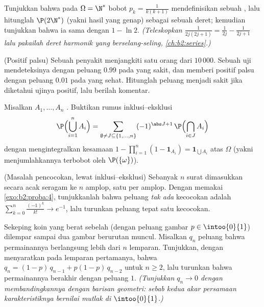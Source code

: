 \begin{exercise}[$\star$]\label{exo:b2:proba:2}
Tunjukkan bahwa pada $\Omega = \N^*$ bobot $p_k = \frac{1}{k(k+1)}$
mendefinisikan sebuah , lalu hitunglah $\P(2\N^*)$ (yakni hasil
yang genap) sebagai sebuah deret; kemudian tunjukkan bahwa ia sama dengan $1 - \ln 2$.
\emph{(Teleskopkan $\frac{1}{2j(2j+1)} = \frac{1}{2j} -
\frac{1}{2j+1}$ lalu pakailah deret harmonik yang berselang-seling,
\cref{ch:b2:series}.)}
\end{exercise}

\begin{exercise}[$\star$]\label{exo:b2:proba:3}
(Positif palsu) Sebuah penyakit menjangkiti satu orang dari $10\,000$. Sebuah
uji mendeteksinya dengan peluang $0.99$ pada yang sakit, dan memberi
positif palsu dengan peluang $0.01$ pada yang sehat. Hitunglah
peluang menjadi sakit jika diketahui ujinya positif, lalu berilah komentar.
\end{exercise}

\begin{exercise}[$\star\star$]\label{exo:b2:proba:4}
Misalkan $A_1, \dots, A_n$ . Buktikan rumus
inklusi--eksklusi
\[
\P\Bigl(\bigcup_{i=1}^n A_i\Bigr)
= \sum_{\emptyset \neq J \subseteq \{1,\dots,n\}}
(-1)^{\abs J + 1}\,\P\Bigl(\bigcap_{i \in J}A_i\Bigr)
\]
dengan mengintegralkan kesamaan $1 - \prod_{i=1}^n(1 -
\mathbf{1}_{A_i}) = \mathbf{1}_{\bigcup A_i}$ atas $\Omega$
(yakni menjumlahkannya terbobot oleh $\P(\{\omega\})$).
\end{exercise}

\begin{exercise}[$\star\star$]\label{exo:b2:proba:5}
(Masalah pencocokan, lewat inklusi--eksklusi) Sebanyak $n$ surat dimasukkan
secara acak seragam ke $n$ amplop, satu per amplop. Dengan memakai
\cref{exo:b2:proba:4}, tunjukkanlah bahwa peluang \emph{tak ada}
kecocokan adalah $\sum_{k=0}^n \frac{(-1)^k}{k!} \to e^{-1}$, lalu
turunkan peluang tepat satu kecocokan.
\end{exercise}

\begin{exercise}[$\star\star$]\label{exo:b2:proba:6}
Sekeping koin yang berat sebelah (dengan peluang gambar $p \in \intoo{0}{1}$) dilempar
sampai dua gambar berurutan muncul. Misalkan $q_n$ peluang
bahwa permainannya berlangsung lebih dari $n$ lemparan. Tunjukkan, dengan menyaratkan pada
lemparan pertamanya, bahwa $q_n = (1-p)\,q_{n-1} + p(1-p)\,q_{n-2}$
untuk $n \geq 2$, lalu turunkan bahwa permainannya berakhir dengan peluang
$1$. \emph{(Tunjukkan $q_n \to 0$ dengan membandingkannya dengan barisan
geometri: sebab kedua akar persamaan karakteristiknya bernilai mutlak di
$\intoo{0}{1}$.)}
\end{exercise}

